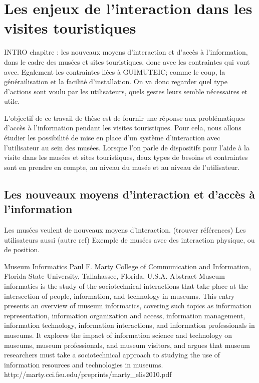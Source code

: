 \chapter{Les enjeux de l'interaction dans les visites touristiques}
\label{chap:etude}

INTRO chapitre : les nouveaux moyens d'interaction et d'accès à l'information, dans le cadre des musées et sites touristiques, donc avec les contraintes qui vont avec. Egalement les contraintes liées à GUIMUTEIC; comme le coup, la générailisation et la facilité d'installation. On va donc regarder quel type d'actions sont voulu par les utilisateurs, quels gestes leurs semble nécessaires et utile.


L'objectif de ce travail de thèse est de fournir une réponse aux problématiques d'accès à l'information pendant les visites touristiques. 
Pour cela, nous allons étudier les possibilité de mise en place d'un système d'interaction avec l'utilisateur au sein des musées.
Lorsque l'on parle de dispositifs pour l'aide à la visite dans les musées et sites touristiques, deux types de besoins et contraintes sont en prendre en compte, au niveau du musée et au niveau de l'utilisateur.


\section{Les nouveaux moyens d'interaction et d'accès à l'information}

Les musées veulent de nouveaux moyens d'interaction. (trouver références)
Les utilisateurs aussi (autre ref)
Exemple de musées avec des interaction physique, ou de position.


Museum Informatics
Paul F. Marty
College of Communication and Information, Florida State University, Tallahassee, Florida, U.S.A.
Abstract
Museum informatics is the study of the sociotechnical interactions that take place at the intersection of
people, information, and technology in museums. This entry presents an overview of museum informatics,
covering such topics as information representation, information organization and access, information
management, information technology, information interactions, and information professionals in
museums. It explores the impact of information science and technology on museums, museum professionals,
and museum visitors, and argues that museum researchers must take a sociotechnical approach to
studying the use of information resources and technologies in museums.
http://marty.cci.fsu.edu/preprints/marty_elis2010.pdf

